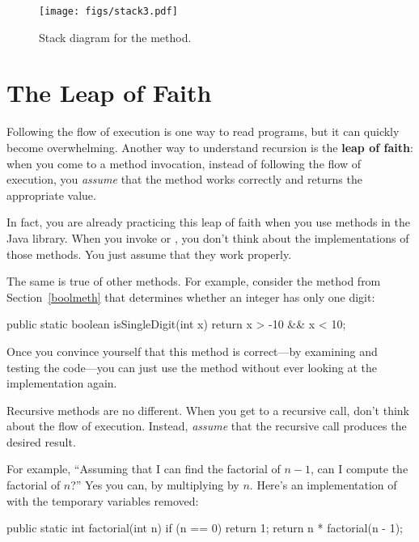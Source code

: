 \begin{figure}[!ht]
\begin{center}
\texttt{[image: figs/stack3.pdf]}
\caption{Stack diagram for the  method.}
\label{fig.stack3}
\end{center}
\end{figure}


\section{The Leap of Faith}
\label{leap_of_faith}


Following the flow of execution is one way to read programs, but it can quickly become overwhelming.
Another way to understand recursion is the {\bf leap of faith}:
when you come to a method invocation, instead of following the flow of execution, you {\em assume} that the method works correctly and returns the appropriate value.

In fact, you are already practicing this leap of faith when you use methods in the Java library.
When you invoke  or , you don't think about the implementations of those methods.
You just assume that they work properly.

The same is true of other methods.
For example, consider the method from Section~\ref{boolmeth} that determines whether an integer has only one digit:

\begin{code}
public static boolean isSingleDigit(int x) {
    return x > -10 && x < 10;
}
\end{code}

Once you convince yourself that this method is correct---by examining and testing the code---you can just use the method without ever looking at the implementation again.

Recursive methods are no different.
When you get to a recursive call, don't think about the flow of execution.
Instead, {\em assume} that the recursive call produces the desired result.

For example, ``Assuming that I can find the factorial of $n-1$, can I compute the factorial of $n$?''
Yes you can, by multiplying by $n$.
Here's an implementation of  with the temporary variables removed:

\begin{code}
public static int factorial(int n) {
    if (n == 0) {
        return 1;
    }
    return n * factorial(n - 1);
}
\end{code}

